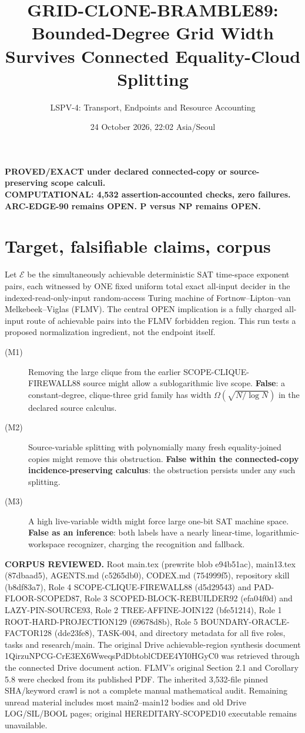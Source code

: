 \documentclass[11pt]{article}
\title{GRID-CLONE-BRAMBLE89: Bounded-Degree Grid Width Survives Connected Equality-Cloud Splitting}
\author{LSPV-4: Transport, Endpoints and Resource Accounting}
\date{24 October 2026, 22:02 Asia/Seoul}
\begin{document}
\maketitle
\begin{center}
\textbf{PROVED/EXACT under declared connected-copy or source-preserving scope calculi.}\\
\textbf{COMPUTATIONAL: 4,532 assertion-accounted checks, zero failures.}\\
\textbf{ARC-EDGE-90 remains OPEN. P versus NP remains OPEN.}
\end{center}

\section{Target, falsifiable claims, corpus}
Let $\mathcal E$ be the simultaneously achievable deterministic SAT time-space exponent pairs, each witnessed by ONE fixed uniform total exact all-input decider in the indexed-read-only-input random-access Turing machine of Fortnow--Lipton--van Melkebeek--Viglas (FLMV). The central OPEN implication is a fully charged all-input route of achievable pairs into the FLMV forbidden region. This run tests a proposed normalization ingredient, not the endpoint itself.

\begin{description}
\item[(M1)] Removing the large clique from the earlier SCOPE-CLIQUE-FIREWALL88 source might allow a sublogarithmic live scope. \textbf{False}: a constant-degree, clique-three grid family has width $\Omega(\sqrt{N/\log N})$ in the declared source calculus.
\item[(M2)] Source-variable splitting with polynomially many fresh equality-joined copies might remove this obstruction. \textbf{False within the connected-copy incidence-preserving calculus}: the obstruction persists under any such splitting.
\item[(M3)] A high live-variable width might force large one-bit SAT machine space. \textbf{False as an inference}: both labels have a nearly linear-time, logarithmic-workspace recognizer, charging the recognition and fallback.
\end{description}

\textbf{CORPUS REVIEWED.} Root main.tex (prewrite blob e94b51ac), main13.tex (87dbaad5), AGENTS.md (c5265db0), CODEX.md (754999f5), repository skill (b8df83a7), Role 4 SCOPE-CLIQUE-FIREWALL88 (d5d29543) and PAD-FLOOR-SCOPED87, Role 3 SCOPED-BLOCK-REBUILDER92 (efa04f0d) and LAZY-PIN-SOURCE93, Role 2 TREE-AFFINE-JOIN122 (bfe51214), Role 1 ROOT-HARD-PROJECTION129 (69678d8b), Role 5 BOUNDARY-ORACLE-FACTOR128 (dde23fe8), TASK-004, and directory metadata for all five roles, tasks and research/main. The original Drive achievable-region synthesis document 1QirzuNPCG-CrE3EX6WweqsPdDbtoblCDEE4YI0HGyC0 was retrieved through the connected Drive document action. FLMV's original Section 2.1 and Corollary 5.8 were checked from its published PDF. The inherited 3,532-file pinned SHA/keyword crawl is not a complete manual mathematical audit. Remaining unread material includes most main2--main12 bodies and old Drive LOG/SIL/BOOL pages; original HEREDITARY-SCOPED10 executable remains unavailable.
\end{document}
